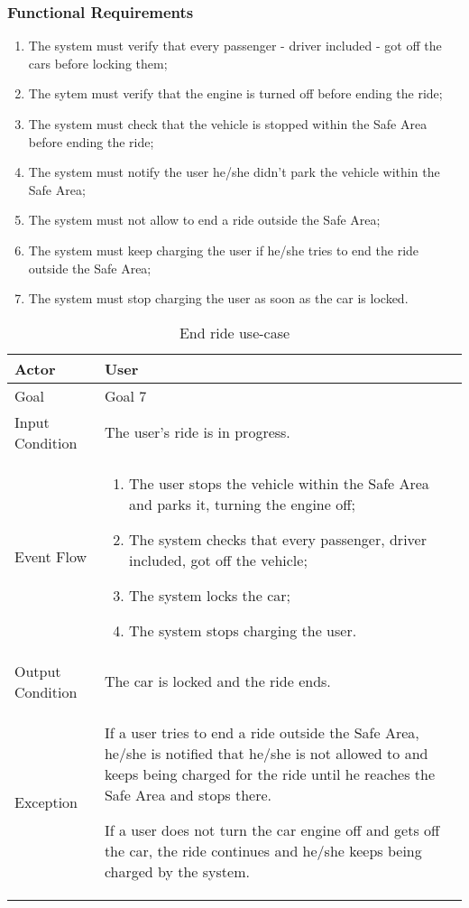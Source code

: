 \subsubsection{Functional Requirements}
\begin{enumerate}
\item The system must verify that every passenger - driver included - got off the cars before locking them;
\item The sytem must verify that the engine is turned off before ending the ride;
\item The system must check that the vehicle is stopped within the Safe Area before ending the ride;
\item The system must notify the user he/she didn't park the vehicle within the Safe Area;
\item The system must not allow to end a ride outside the Safe Area;
\item The system must keep charging the user if he/she tries to end the ride outside the Safe Area;
\item The system must stop charging the user as soon as the car is locked.
\end{enumerate}

\begin{table}[H]
\begin{center}
\begin{tabular}{p{} | p{}}
\hline
Actor & User\\
\hline
Goal & Goal 7\\
\hline
Input Condition & The user's ride is in progress.\\
\hline
Event Flow & 
\begin{enumerate}
\item The user stops the vehicle within the Safe Area and parks it, turning the engine off;
\item The system checks that every passenger, driver included, got off the vehicle;
\item The system locks the car;
\item The system stops charging the user.
\end{enumerate} \\
\hline
Output Condition & The car is locked and the ride ends.\\
\hline
Exception & If a user tries to end a ride outside the Safe Area, he/she is notified that he/she is not allowed to and keeps being charged for the ride until he reaches the Safe Area and stops there.

If a user does not turn the car engine off and gets off the car, the ride continues and he/she keeps being charged by the system.\\
\hline
\end{tabular}
\end{center}
\caption{End ride use-case}
\label{end_ride_uc}
\end{table}
